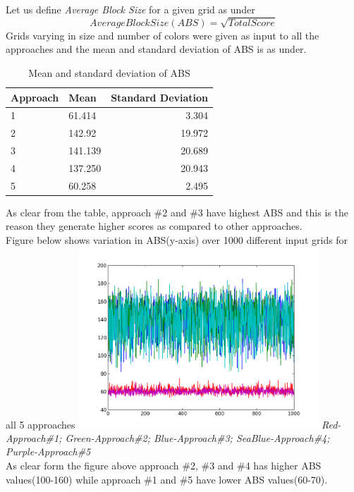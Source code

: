 \documentclass[twoside]{article}
\begin{document}
\begin{multicols}{2}
Let us define \textit{Average Block Size} for a given grid as under
\begin{equation}
\label{eq:emc}
Average Block Size(ABS) =\sqrt{Total Score}
\end{equation}
Grids varying in size and number of colors were given as input to all the approaches and the mean and standard deviation of ABS is as under.

\begin{table}[H]
\caption{Mean and standard deviation of ABS}
\centering
\begin{tabular}{llr}
\toprule
Approach & Mean& Standard Deviation \\
\midrule
1 & 61.414 & 3.304 \\
2 & 142.92 & 19.972\\
3 & 141.139 & 20.689\\
4 & 137.250 & 20.943\\
5 & 60.258 & 2.495\\
\bottomrule
\end{tabular}
\end{table}
As clear from the table, approach \#2 and \#3 have highest ABS and this is the reason they generate higher scores as compared to other approaches.\\ 
Figure below shows variation in ABS(y-axis) over 1000 different input grids for all 5 approaches
\includegraphics[width=9cm]{blocksize.png}
\footnotesize \emph{Red-Approach\#1; Green-Approach\#2; Blue-Approach\#3; SeaBlue-Approach\#4; Purple-Approach\#5 }\\
\normalsize
As clear form the figure above approach \#2, \#3 and \#4 has higher ABS values(100-160) while approach \#1 and \#5 have lower ABS values(60-70).




\end{multicols}
\end{document}
